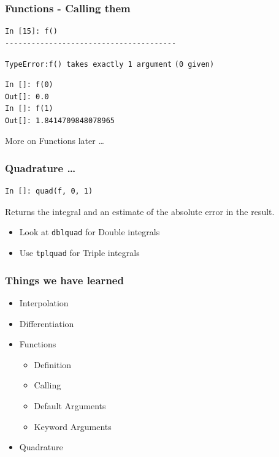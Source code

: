 \documentclass[14pt,compress]{beamer}
\newcommand{\typ}[1]{\lstinline{#1}}
\begin{document}
\begin{frame}[fragile]
\frametitle{Functions - Calling them}
\begin{lstlisting}
In [15]: f()
---------------------------------------
\end{lstlisting}
\alert{\typ{TypeError:}}\typ{f() takes exactly 1 argument}
\typ{(0 given)}
\begin{lstlisting}
In []: f(0)
Out[]: 0.0
In []: f(1)
Out[]: 1.8414709848078965
\end{lstlisting}
More on Functions later \ldots
\end{frame}

\begin{frame}[fragile]
\frametitle{Quadrature \ldots}
\begin{lstlisting}
In []: quad(f, 0, 1)
\end{lstlisting}
Returns the integral and an estimate of the absolute error in the result.
\begin{itemize}
\item Look at \typ{dblquad} for Double integrals
\item Use \typ{tplquad} for Triple integrals
\end{itemize}
\end{frame}

\begin{frame}
  \frametitle{Things we have learned}
  \begin{itemize}
  \item Interpolation
  \item Differentiation
  \item Functions
    \begin{itemize}
    \item Definition
    \item Calling
    \item Default Arguments
    \item Keyword Arguments
    \end{itemize}
  \item Quadrature
  \end{itemize}
\end{frame}
\end{document}

